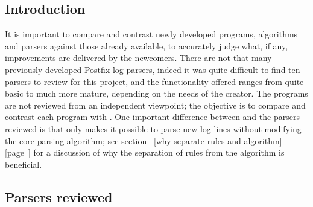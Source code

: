 \documentclass[a4paper,12pt,draft]{article}
\newcommand{\parsername}{\PLP{}}
\newcommand{\refwithpage}[1]{%
    \empty{}\ref{#1} [page~\pageref{#1}]%
}
\begin{document}
\label{other-parsers}

\subsection{Introduction}

It is important to compare and contrast newly developed programs,
algorithms and parsers against those already available, to accurately judge
what, if any, improvements are delivered by the newcomers.  There are not
that many previously developed Postfix log parsers, indeed it was quite
difficult to find ten parsers to review for this project, and the
functionality offered ranges from quite basic to much more mature,
depending on the needs of the creator.  The programs are not reviewed from
an independent viewpoint; the objective is to compare and contrast each
program with \parsername{}.  One important difference between \parsername{}
and the parsers reviewed is that only \parsername{} makes it possible to
parse new log lines without modifying the core parsing algorithm; see
section~\refwithpage{why separate rules and algorithm} for a discussion of
why the separation of rules from the algorithm is beneficial.


\subsection{Parsers reviewed}
\end{document}
